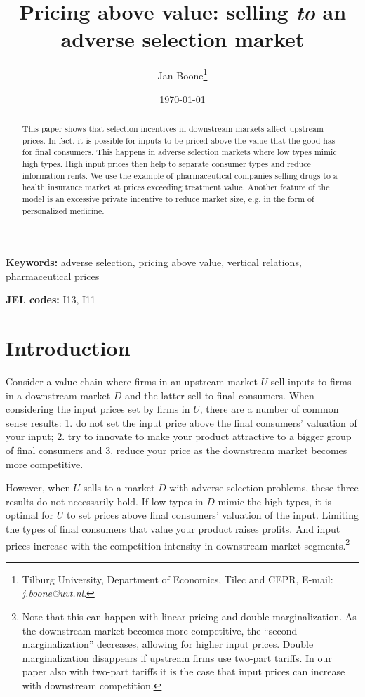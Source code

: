 \documentclass[a4paper,12pt]{article}
\author{Jan Boone\thanks{Tilburg University, Department of Economics, Tilec and CEPR, E-mail: \textit{j.boone@uvt.nl}.}}
\date{\today}
\title{Pricing above value: selling \emph{to} an adverse selection market}
\begin{document}
\maketitle
\maketitle
\begin{abstract}
This paper shows that selection incentives in downstream markets affect upstream prices. In fact, it is possible for inputs to be priced above the value that the good has for final consumers. This happens in adverse selection markets where low types mimic high types. High input prices then help to separate consumer types and reduce information rents. We use the example of pharmaceutical companies selling drugs to a health insurance market at prices exceeding treatment value. Another feature of the model is an excessive private incentive to reduce market size, e.g. in the form of personalized medicine.
\end{abstract}

\textbf{Keywords:} adverse selection, pricing above value, vertical relations, pharmaceutical prices

\textbf{JEL codes:} I13, I11


\newpage

\section{Introduction}
\label{sec:org3e45ec4}

Consider a value chain where firms in an upstream market \(U\) sell inputs to firms in a downstream market \(D\) and the latter sell to final consumers. When considering the input prices set by firms in \(U\), there are a number of common sense results: 1. do not set the input price above the final consumers' valuation of your input; 2. try to innovate to make your product attractive to a bigger group of final consumers and 3. reduce your price as the downstream market becomes more competitive.

However, when \(U\) sells to a market \(D\) with adverse selection problems, these three results do not necessarily hold. If low types in \(D\) mimic the high types, it is optimal for \(U\) to set prices above final consumers' valuation of the input. Limiting the types of final consumers that value your product raises profits. And input prices increase with the competition intensity in downstream market segments.\footnote{Note that this can happen with linear pricing and double marginalization. As the downstream market becomes more competitive, the ``second marginalization'' decreases, allowing for higher input prices. Double marginalization disappears if upstream firms use two-part tariffs. In our paper also with two-part tariffs it is the case that input prices can increase with downstream competition.}
\end{document}
